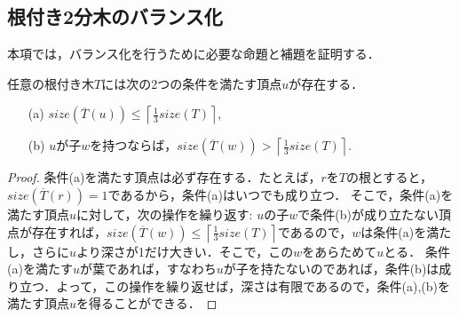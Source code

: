 %
%
%
%

\subsection{根付き2分木のバランス化}


本項では，バランス化を行うために必要な命題と補題を証明する．

\begin{proposition}\label{prop:base}
任意の根付き木$T$には次の2つの条件を満たす頂点$u$が存在する．
\begin{enumerate}
  \item[(a)] $\displaystyle size(\overline{T}(u))\leq\left\lceil\frac{1}{3}size(T)\right\rceil$,
  \item[(b)] $u$が子$w$を持つならば，$\displaystyle size(\overline{T}(w))>\left\lceil\frac{1}{3}size(T)\right\rceil$.
\end{enumerate}
\end{proposition}

\begin{proof}
条件(a)を満たす頂点は必ず存在する．たとえば，$r$を$T$の根とすると，$size(\overline{T}(r))=1$であるから，条件(a)はいつでも成り立つ．
そこで，条件(a)を満たす頂点$u$に対して，次の操作を繰り返す:
$u$の子$w$で条件(b)が成り立たない頂点が存在すれば，$size(\overline{T}(w))\leq\left\lceil\frac{1}{3}size(T)\right\rceil$であるので，$w$は条件(a)を満たし，さらに$u$より深さが1だけ大きい．そこで，この$w$をあらためて$u$とる．
条件(a)を満たす$u$が葉であれば，すなわち$u$が子を持たないのであれば，条件(b)は成り立つ．よって，この操作を繰り返せば，深さは有限であるので，条件(a),(b)を満たす頂点$u$を得ることができる．
\end{proof}

